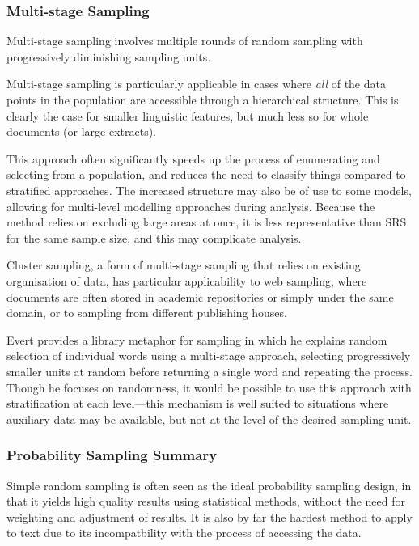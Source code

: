 

\subsubsection{Multi-stage Sampling}
Multi-stage sampling involves multiple rounds of random sampling with progressively diminishing sampling units.

Multi-stage sampling is particularly applicable in cases where \textsl{all} of the data points in the population are accessible through a hierarchical structure.  This is clearly the case for smaller linguistic features, but much less so for whole documents (or large extracts).

This approach often significantly speeds up the process of enumerating and selecting from a population, and reduces the need to classify things compared to stratified approaches.  The increased structure may also be of use to some models, allowing for multi-level modelling approaches during analysis.  Because the method relies on excluding large areas at once, it is less representative than SRS for the same sample size, and this may complicate analysis.

Cluster sampling, a form of multi-stage sampling that relies on existing organisation of data, has particular applicability to web sampling, where documents are often stored in academic repositories or simply under the same domain, or to sampling from different publishing houses.

Evert provides a library metaphor for sampling in which he explains random selection of individual words using a multi-stage approach\cite{evert2006random}, selecting progressively smaller units at random before returning a single word and repeating the process.  Though he focuses on randomness, it would be possible to use this approach with stratification at each level---this mechanism is well suited to situations where auxiliary data may be available, but not at the level of the desired sampling unit.

\subsubsection{Probability Sampling Summary}
Simple random sampling is often seen as the ideal probability sampling design, in that it yields high quality results using statistical methods, without the need for weighting and adjustment of results.  It is also by far the hardest method to apply to text due to its incompatbility with the process of accessing the data.

